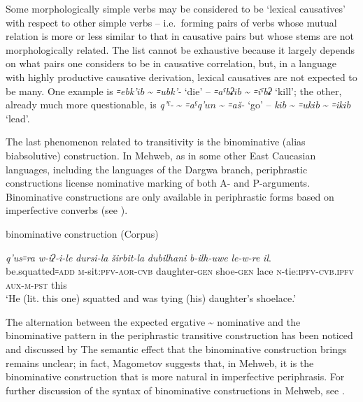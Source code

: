 \documentclass[output=paper]{langsci/langscibook}
\begin{document}
Some morphologically simple verbs may be considered to be `lexical 
causatives' with respect to other simple verbs – i.e.\ forming pairs of
verbs whose mutual relation is more or less similar to that in causative
pairs but whose stems are not morphologically related. The list cannot
be exhaustive because it largely depends on what pairs one considers to
be in causative correlation, but, in a language with highly
productive causative derivation, lexical causatives are not expected to be many. One
example is \emph{꞊ebk'\(ib\)} \textasciitilde{} \emph{꞊ubk'-} `die' –
\emph{꞊aˤbʡ\(ib\)} \textasciitilde{} \emph{꞊iˤbʡ} `kill'; the other,
already much more questionable, is \emph{q'ˤ-} \textasciitilde{} \emph{꞊aˤq'\(un\)}
\textasciitilde{} \emph{꞊aš-} `go' – \emph{k\(ib\)} \textasciitilde{} \emph{꞊uk\(ib\)}
\textasciitilde{} \emph{꞊ik\(ib\)} `lead'.

The last phenomenon related to transitivity is the binominative (alias
biabsolutive) construction. In Mehweb, as in some other East Caucasian
languages, including the languages of the Dargwa branch, periphrastic
constructions license nominative marking of both A- and P-arguments.
Binominative constructions are only available in periphrastic forms
based on imperfective converbs (see \citealt{ganenkov2019}).

\ea %
binominative construction (Corpus)

\gll \emph{q'us꞊ra}  \emph{w-iʔ-i-le}  \emph{dursi-la}  \emph{širbit-la} \emph{dubilhani} \emph{b-ilh-uwe}  \emph{le-w-re}  \emph{il}.\\
be.squatted꞊\textsc{add}  \textsc{m}-sit:\textsc{pfv}-\textsc{aor}-\textsc{cvb}  daughter-\textsc{gen}  shoe-\textsc{gen}  lace \textsc{n}-tie:\textsc{ipfv}-\textsc{cvb.ipfv}  \textsc{aux}-\textsc{m}-\textsc{pst} this\\
\glt `He (lit. this one) squatted and was tying (his) daughter’s shoelace.'
\z

The alternation between the expected ergative \textasciitilde{}
nominative and the binominative pattern in the periphrastic transitive
construction has been noticed and discussed by \citet[84ff.]{magometov1982}
The semantic effect that the binominative construction brings remains
unclear; in fact, Magometov suggests that, in Mehweb, it is the
binominative construction that is more natural in imperfective
periphrasis.
For further discussion of the syntax of binominative constructions in Mehweb, see
\citet{ganenkov2019,lander2019}.
\end{document}
